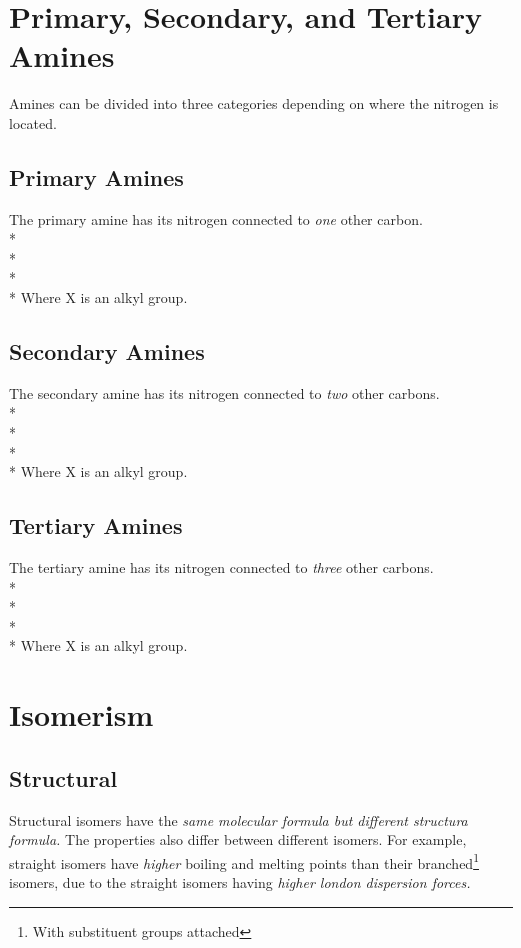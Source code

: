 \documentclass[11pt,twoside]{article}
\begin{document}
	\section{Primary, Secondary, and Tertiary Amines}
		Amines can be divided into three categories depending on where the nitrogen is located.
		\subsection{Primary Amines}
			The primary amine has its nitrogen connected to \emph{one} other carbon.
			\\* \\*
			\\* \\*
			Where X is an alkyl group.
		\subsection{Secondary Amines}
			The secondary amine has its nitrogen connected to \emph{two} other carbons.
			\\* \\*
			\\* \\*
			Where X is an alkyl group.
		\subsection{Tertiary Amines}
			The tertiary amine has its nitrogen connected to \emph{three} other carbons.
			\\* \\*
			\\* \\*
			Where X is an alkyl group.
			
	\section{Isomerism}
		\subsection{Structural}
			Structural isomers have the \emph{same molecular formula but different structura formula.} The properties also differ between different isomers. For example, straight isomers have \emph{higher} boiling and melting points than their branched\footnote{With substituent groups attached} isomers, due to the straight isomers having \emph{higher london dispersion forces.} \newpage
\end{document}
